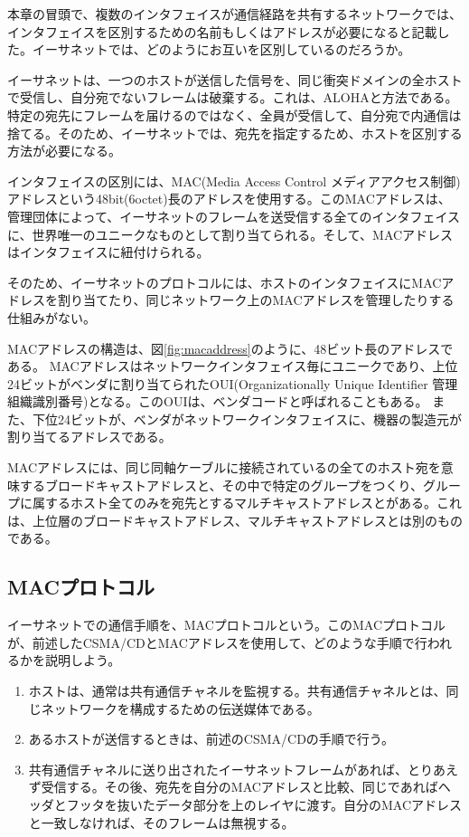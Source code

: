 本章の冒頭で、複数のインタフェイスが通信経路を共有するネットワークでは、インタフェイスを区別するための名前もしくはアドレスが必要になると記載した。イーサネットでは、どのようにお互いを区別しているのだろうか。

イーサネットは、一つのホストが送信した信号を、同じ衝突ドメインの全ホストで受信し、自分宛でないフレームは破棄する。これは、ALOHAと方法である。特定の宛先にフレームを届けるのではなく、全員が受信して、自分宛で内通信は捨てる。そのため、イーサネットでは、宛先を指定するため、ホストを区別する方法が必要になる。

インタフェイスの区別には、MAC(Media Access Control メディアアクセス制御)アドレスという48bit(6octet)長のアドレスを使用する。このMACアドレスは、管理団体によって、イーサネットのフレームを送受信する全てのインタフェイスに、世界唯一のユニークなものとして割り当てられる。そして、MACアドレスはインタフェイスに紐付けられる。

そのため、イーサネットのプロトコルには、ホストのインタフェイスにMACアドレスを割り当てたり、同じネットワーク上のMACアドレスを管理したりする仕組みがない。



MACアドレスの構造は、図\ref{fig:macaddress}のように、48ビット長のアドレスである。
MACアドレスはネットワークインタフェイス毎にユニークであり、上位24ビットがベンダに割り当てられたOUI(Organizationally Unique Identifier 管理組織識別番号)となる。このOUIは、ベンダコードと呼ばれることもある。
また、下位24ビットが、ベンダがネットワークインタフェイスに、機器の製造元が割り当てるアドレスである。

MACアドレスには、同じ同軸ケーブルに接続されているの全てのホスト宛を意味するブロードキャストアドレスと、その中で特定のグループをつくり、グループに属するホスト全てのみを宛先とするマルチキャストアドレスとがある。これは、上位層のブロードキャストアドレス、マルチキャストアドレスとは別のものである。

\subsection{MACプロトコル}

イーサネットでの通信手順を、MACプロトコルという。このMACプロトコルが、前述したCSMA/CDとMACアドレスを使用して、どのような手順で行われるかを説明しよう。
\begin{enumerate}
\item ホストは、通常は共有通信チャネルを監視する。共有通信チャネルとは、同じネットワークを構成するための伝送媒体である。
\item あるホストが送信するときは、前述のCSMA/CDの手順で行う。
\item 共有通信チャネルに送り出されたイーサネットフレームがあれば、とりあえず受信する。その後、宛先を自分のMACアドレスと比較、同じであればヘッダとフッタを抜いたデータ部分を上のレイヤに渡す。自分のMACアドレスと一致しなければ、そのフレームは無視する。
\end{enumerate}

